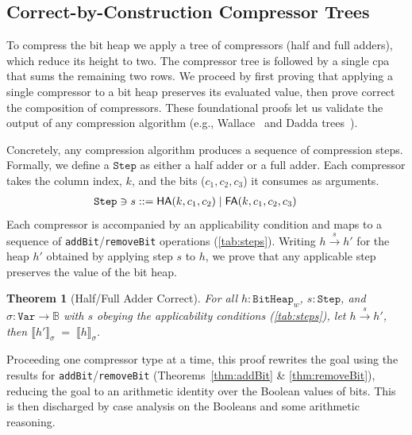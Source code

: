 \documentclass[conference]{IEEEtran}
\newcommand{\hsem}[1]{\llbracket #1 \rrbracket_{\sigma}}
\newcommand{\Heap}{\ensuremath{\texttt{BitHeap}}\xspace}
\newcommand{\Step}{\ensuremath{\texttt{Step}}\xspace}
\newcommand{\HA}{\mathsf{HA}}
\newcommand{\FA}{\mathsf{FA}}
\theoremstyle{plain}
\newtheorem{theorem}{Theorem}
\theoremstyle{definition}
\begin{document}
\subsection{Correct-by-Construction Compressor Trees}\label{subsec:compression}

To compress the bit heap we apply a tree of compressors (half and full adders),
which reduce its height to two.
The compressor tree is followed by a single \ac{cpa} that sums the remaining two rows.
We proceed by first proving that applying a single compressor to a bit heap preserves its evaluated value,
then prove correct the composition of compressors.
These foundational proofs let us validate the output of any compression algorithm (e.g., Wallace~\cite{wallace_tree} and Dadda trees~\cite{dadda_tree}).

Concretely, any compression algorithm produces a sequence of compression steps.
Formally, we define a \Step as either a half adder or a full adder. Each compressor takes
the column index, $k$, and the bits ($c_1, c_2, c_3$) it consumes as arguments.
\[
\begin{array}{r@{\;}c@{\;}l@{\qquad}l}
\Step \ni s &::=& \HA(k,c_1,c_2) \mid \FA(k,c_1,c_2,c_3) &
\end{array}
\]
Each compressor is accompanied by an applicability condition and maps to a sequence 
of \texttt{addBit}/\texttt{removeBit} operations (\autoref{tab:steps}).
Writing $h \xrightarrow{s} h'$ for the heap $h'$ obtained by applying step $s$ to $h$, we prove that any applicable step preserves the value of the bit heap.
\begin{theorem}[Half/Full Adder Correct]
\label{thm:step-correct}
For all $h : \Heap_w$, $s : \Step$, and $\sigma : \texttt{Var} \to \mathbb{B}$
with $s$ obeying the applicability conditions (\autoref{tab:steps}),
let $h \xrightarrow{s} h'$, then $\hsem{h'} \;=\; \hsem{h}$.
\end{theorem}

Proceeding one compressor type at a time, this proof rewrites the goal using the results for 
\texttt{addBit}/\texttt{removeBit} (Theorems~\ref{thm:addBit} \& \ref{thm:removeBit}), reducing the
goal to an arithmetic identity over the Boolean values of bits.
This is then discharged by case analysis on the Booleans and some arithmetic reasoning.
\end{document}

